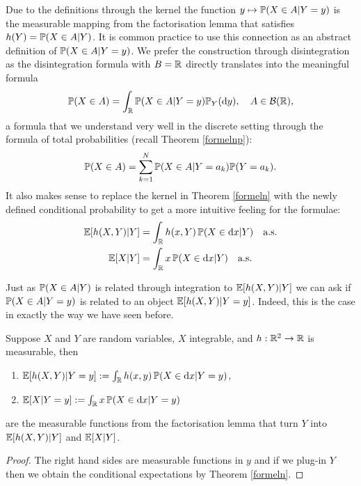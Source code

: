 Due to the definitions through the kernel the function $y\mapsto \P(X\in A|Y=y)$ is the measurable mapping from the factorisation lemma that satisfies $h(Y)=\P(X\in A|Y)$. It is common practice to use this connection as an abstract definition of $\P(X\in A|Y=y)$. We prefer the construction through disintegration as the disintegration formula with $B=\R$ directly translates into the meaningful formula
	\begin{align*}
		\P(X\in A)=\int_\R \P(X\in A|Y=y) \P_Y(\mathrm dy),\quad A\in \mathcal B(\R),
	\end{align*}
	a formula that we understand very well in the discrete setting through the formula of total probabilities (recall Theorem \ref{formelnp}):
	\begin{align*}
		\P(X\in A)=\sum_{k=1}^N \P(X\in A|Y=a_k) \P(Y=a_k).
	\end{align*}
It also makes sense to replace the kernel in Theorem \ref{formeln} with the newly defined conditional probability to get a more intuitive feeling for the formulae:
\begin{align*}
	\E[h(X,Y)|Y]&=\int_\R h(x,Y)\, \P(X\in \mathrm dx|Y)\quad \text{a.s.}\\
	\E[X|Y]&=\int_\R x\, \P(X\in \mathrm dx|Y)\quad \text{a.s.}
\end{align*}


Just as $\P(X\in A|Y)$ is related through integration to $\E[h(X,Y)|Y]$ we can ask if $\P(X\in A|Y=y)$ is related to an object $\E[h(X,Y)|Y=y]$.  Indeed, this is the case in exactly the way we have seen before.





\begin{lsatz}
\begin{theorem}
	Suppose $X$ and $Y$ are random variables, $X$ integrable, and $h:\R^2\to\R$ is measurable, then
	\begin{enumerate}[label=(\roman*)]
		\item $\E[h(X,Y)|Y=y]:=\int_\R h(x,y) \, \P(X\in \mathrm dx|Y=y)$,
			\item $\E[X|Y=y]:=\int_\R x \, \P(X\in \mathrm dx|Y=y)$
	\end{enumerate}
	are the measurable functions from the factorisation lemma that turn $Y$ into $\E[h(X,Y)|Y]$ and $\E[X|Y]$.
\end{theorem}
\end{lsatz}
\begin{proof}[Proof]
	The right hand sides are measurable functions in $y$ and if we plug-in $Y$ then we obtain the conditional expectations by Theorem \ref{formeln}.
\end{proof}



